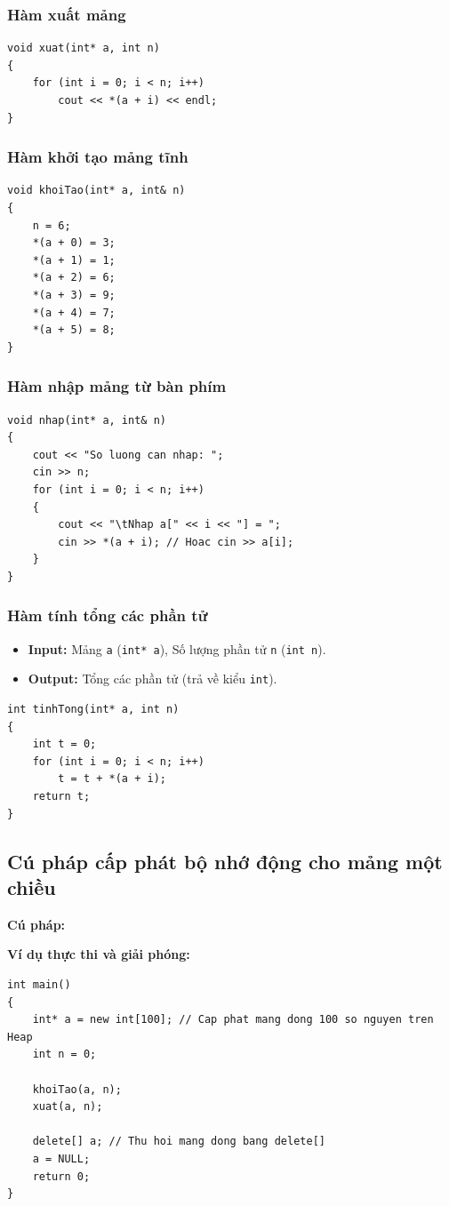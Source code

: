 \documentclass[12pt,a4paper]{article}
\begin{document}
\subsubsection{Hàm xuất mảng}
\begin{lstlisting}
void xuat(int* a, int n)
{
    for (int i = 0; i < n; i++)
        cout << *(a + i) << endl;
}
\end{lstlisting}

\subsubsection{Hàm khởi tạo mảng tĩnh}
\begin{lstlisting}
void khoiTao(int* a, int& n)
{
    n = 6;
    *(a + 0) = 3;
    *(a + 1) = 1;
    *(a + 2) = 6;
    *(a + 3) = 9;
    *(a + 4) = 7;
    *(a + 5) = 8;
}
\end{lstlisting}

\subsubsection{Hàm nhập mảng từ bàn phím}
\begin{lstlisting}
void nhap(int* a, int& n)
{
    cout << "So luong can nhap: ";
    cin >> n;
    for (int i = 0; i < n; i++)
    {
        cout << "\tNhap a[" << i << "] = ";
        cin >> *(a + i); // Hoac cin >> a[i];
    }
}
\end{lstlisting}

\subsubsection{Hàm tính tổng các phần tử}
\begin{itemize}[itemsep=0.1em]
    \item \textbf{Input:} Mảng \texttt{a} (\texttt{int* a}), Số lượng phần tử \texttt{n} (\texttt{int n}).
    \item \textbf{Output:} Tổng các phần tử (trả về kiểu \texttt{int}).
\end{itemize}
\begin{lstlisting}
int tinhTong(int* a, int n)
{
    int t = 0;
    for (int i = 0; i < n; i++)
        t = t + *(a + i);
    return t;
}
\end{lstlisting}

\subsection{Cú pháp cấp phát bộ nhớ động cho mảng một chiều}
\textbf{Cú pháp:}
\begin{center}
\end{center}
\textbf{Ví dụ thực thi và giải phóng:}
\begin{lstlisting}
int main()
{
    int* a = new int[100]; // Cap phat mang dong 100 so nguyen tren Heap
    int n = 0;

    khoiTao(a, n);
    xuat(a, n);

    delete[] a; // Thu hoi mang dong bang delete[]
    a = NULL;
    return 0;
}
\end{lstlisting}
\end{document}
